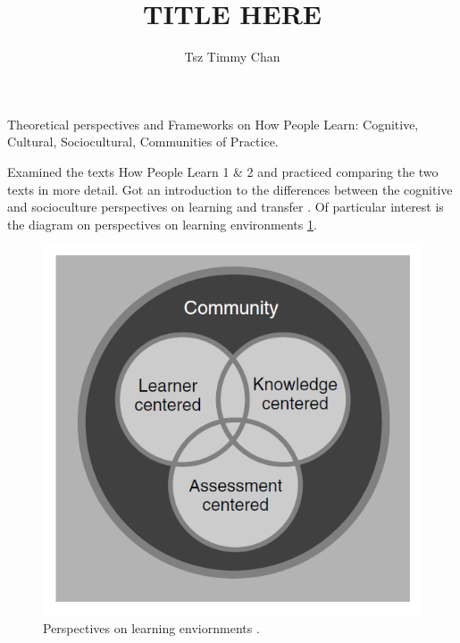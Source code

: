 \documentclass{TC}
\title{TITLE HERE}	%
\author{Tsz Timmy Chan}	%
\begin{document}
Theoretical perspectives and Frameworks on How People Learn: Cognitive, Cultural, Sociocultural, Communities of Practice.

Examined the texts How People Learn 1 \& 2 and practiced comparing the two texts in more detail. Got an introduction to the differences between the cognitive and socioculture perspectives on learning and transfer \parencite{sawyer_learning_2014, satyam_cognitive_2018, national_academies_of_sciences_engineering_and_medicine_context_2018, national_academies_of_sciences_engineering_and_medicine_introduction_2018, bransford_design_2000,
bransford_learning:_2000}. Of particular interest is the diagram on perspectives on learning environments \ref{fig:NRC_perspectives_on_learning_enviornment}.

\begin{figure}[h]
\centering
\includegraphics[width=.5\textwidth]{NRC_perspectives_on_learning_enviornment}

\caption{Perspectives on learning enviornments \parencite{bransford_design_2000}.}
\label{fig:NRC_perspectives_on_learning_enviornment}
\end{figure}
\end{document}
